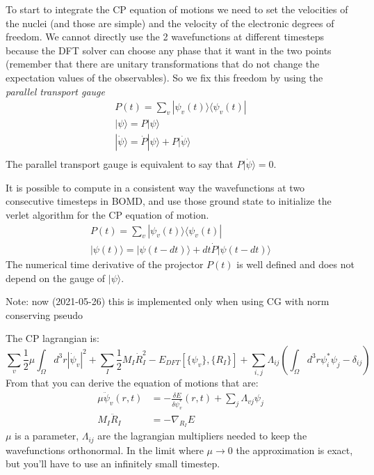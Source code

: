 \documentclass[landscape]{foils}
\begin{document}
To start to integrate the CP equation of motions we need to set the velocities of the nuclei (and those are simple) and the velocity of the electronic degrees of freedom. We cannot directly use the 2 wavefunctions at different timesteps because the DFT solver can choose any phase that it want in the two points (remember that there are unitary transformations that do not change the expectation values of the observables). So we fix this freedom by using the \emph{parallel transport gauge}
\begin{align}
	P(t) = \sum_{v}|\psi_v(t)\rangle\langle\psi_v(t)|\\
	|\psi\rangle = P|\psi\rangle\\
	|\dot\psi\rangle = \dot P|\psi\rangle + P |\dot\psi\rangle\\
\end{align}
The parallel transport gauge is equivalent to say that $P |\dot\psi\rangle=0$.

It is possible to compute in a consistent way the wavefunctions at two consecutive timesteps in BOMD, and use those ground state to initialize the verlet algorithm for the CP equation of motion. 
\begin{align}
	P(t) = \sum_{v}|\psi_v(t)\rangle\langle\psi_v(t)|\\
	|\psi(t)\rangle = |\psi(t-dt)\rangle + dt\dot P |\psi(t-dt)\rangle
\end{align}
The numerical time derivative of the projector $P(t)$ is well defined and does not depend on the gauge of $|\psi\rangle$.

{\small Note: now (2021-05-26) this is implemented only when using CG with norm conserving pseudo}

The CP lagrangian is:
\begin{equation}
    \sum_v\frac{1}{2}\mu\int_{\Omega}d^3r|\dot\psi_v|^2+\sum_I\frac{1}{2}M_I\dot R_I^2-E_{DFT}[\{\psi_v\},\{R_I\}] + \sum_{i,j}\Lambda_{ij}\left(\int_{\Omega}d^3r\psi_i^*\psi_j-\delta_{ij}\right)
\end{equation}
From that you can derive the equation of motions that are:
\begin{align}
    \mu\ddot\psi_v(r,t)&=-\frac{\delta E}{\delta\psi_v^*}(r,t)+\sum_{j}\Lambda_{vj}\psi_j \\
    M_I\ddot R_I &= - \nabla_{R_I} E
\end{align}
$\mu$ is a parameter, $\Lambda_{ij}$ are the lagrangian multipliers needed to keep the wavefunctions orthonormal. In the limit where $\mu \to 0$ the approximation is exact, but you'll have to use an infinitely small timestep.
\end{document}
